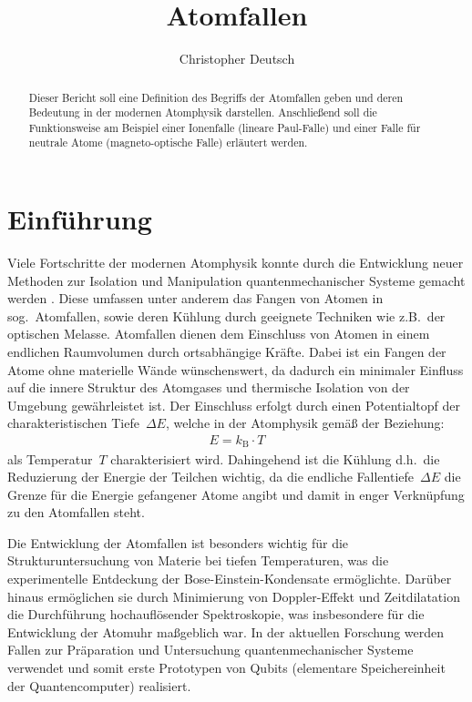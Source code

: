 \documentclass[twocolumn]{revtex4}
\begin{document}
\title{Atomfallen}

\author{Christopher Deutsch}




\begin{abstract}
%
Dieser Bericht soll eine Definition des Begriffs der Atomfallen geben und deren Bedeutung in der modernen Atomphysik darstellen. Anschließend soll die Funktionsweise am Beispiel einer Ionenfalle (lineare Paul-Falle) und einer Falle für neutrale Atome (magneto-optische Falle) erläutert werden.
%
\end{abstract}

\maketitle

\section{Einführung}
Viele Fortschritte der modernen Atomphysik konnte durch die Entwicklung neuer Methoden zur Isolation und Manipulation quantenmechanischer Systeme gemacht werden \cite{trapping}.
Diese umfassen unter anderem das Fangen von Atomen in sog.~Atomfallen, sowie deren Kühlung durch geeignete Techniken wie z.B.\ der optischen Melasse.
Atomfallen dienen dem Einschluss von Atomen in einem endlichen Raumvolumen durch ortsabhängige Kräfte. 
Dabei ist ein Fangen der Atome ohne materielle Wände wünschenswert, da dadurch ein minimaler Einfluss auf die innere Struktur des Atomgases und thermische Isolation von der Umgebung gewährleistet ist.
Der Einschluss erfolgt durch einen Potentialtopf der charakteristischen Tiefe~$\Delta E$, welche in der Atomphysik gemäß der Beziehung:
\begin{align}
	E = k_\mathrm{B} \cdot T
\end{align}
als Temperatur~$T$ charakterisiert wird.
Dahingehend ist die Kühlung d.h.\ die Reduzierung der Energie der Teilchen wichtig, da die endliche Fallentiefe~$\Delta E$ die Grenze für die Energie gefangener Atome angibt und damit in enger Verknüpfung zu den Atomfallen steht.

Die Entwicklung der Atomfallen ist besonders wichtig für die Strukturuntersuchung von Materie bei tiefen Temperaturen, was die experimentelle Entdeckung der Bose-Einstein-Kondensate ermöglichte.
Darüber hinaus ermöglichen sie durch Minimierung von Doppler-Effekt und Zeitdilatation die Durchführung hochauflösender Spektroskopie, was insbesondere für die Entwicklung der Atomuhr maßgeblich war.
In der aktuellen Forschung werden Fallen zur Präparation und Untersuchung quantenmechanischer Systeme verwendet und somit erste Prototypen von Qubits (elementare Speichereinheit der Quantencomputer) realisiert.
\end{document}
